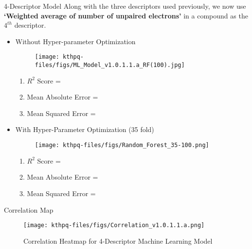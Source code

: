 \documentclass[14pt, t, lualatex]{beamer}
\begin{document}
\begin{frame}{4-Descriptor Model}
Along with the three descriptors used previously, we now use \textbf{`Weighted average of number of unpaired electrons'} in a compound as the $4^{th}$ descriptor. 
\\

\begin{minipage}[t]{0.5\linewidth}
\begin{itemize}
    \item Without Hyper-parameter Optimization 
    \begin{figure}
        \centering
        \texttt{[image: kthpq-files/figs/ML\_Model\_v1.0.1.1.a\_RF(100).jpg]}
    \end{figure}
    \begin{enumerate}
        \item $R^{2}$ Score = 
        \item Mean Absolute Error =
        \item Mean Squared Error = 
    \end{enumerate}
\end{itemize}
\end{minipage}%
\hfill%
\begin{minipage}[t]{0.5\linewidth}
\begin{itemize}
    \item With Hyper-Parameter Optimization (35 fold) 
    \begin{figure}
        \centering
        \texttt{[image: kthpq-files/figs/Random\_Forest\_35-100.png]}
    \end{figure}
    \begin{enumerate}
        \item $R^{2}$ Score = 
        \item Mean Absolute Error =
        \item Mean Squared Error = 
    \end{enumerate}
\end{itemize}
\end{minipage}%
\end{frame}

\begin{frame}{Correlation Map}
\begin{figure}
    \centering
    \texttt{[image: kthpq-files/figs/Correlation\_v1.0.1.1.a.png]}
    \caption{Correlation Heatmap for 4-Descriptor Machine Learning Model}
\end{figure}
\end{frame}

\end{document}
